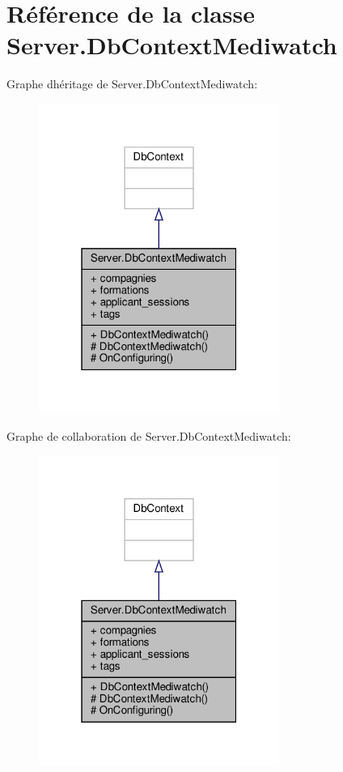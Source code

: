 \hypertarget{class_server_1_1_db_context_mediwatch}{}\section{Référence de la classe Server.\+Db\+Context\+Mediwatch}
\label{class_server_1_1_db_context_mediwatch}


Graphe d\textquotesingle{}héritage de Server.\+Db\+Context\+Mediwatch\+:\nopagebreak
\begin{figure}[H]
\begin{center}
\leavevmode
\includegraphics[width=223pt]{class_server_1_1_db_context_mediwatch__inherit__graph}
\end{center}
\end{figure}


Graphe de collaboration de Server.\+Db\+Context\+Mediwatch\+:\nopagebreak
\begin{figure}[H]
\begin{center}
\leavevmode
\includegraphics[width=223pt]{class_server_1_1_db_context_mediwatch__coll__graph}
\end{center}
\end{figure}
